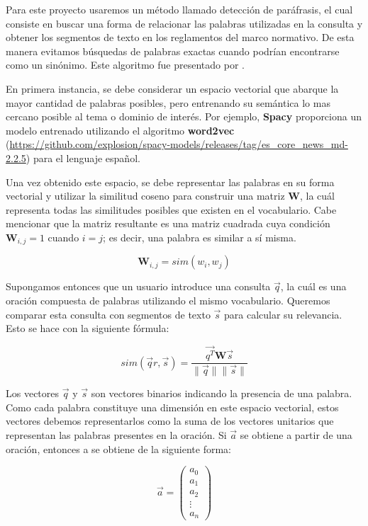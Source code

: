 Para este proyecto usaremos un método llamado detección de paráfrasis, el cual consiste en buscar una forma de relacionar las palabras utilizadas en la consulta y obtener los segmentos de texto en los reglamentos del marco normativo. De esta manera evitamos búsquedas de palabras exactas cuando podrían encontrarse como un sinónimo. Este algoritmo fue presentado por \cite{fernando2008semantic}.

En primera instancia, se debe considerar un espacio vectorial que abarque la mayor cantidad de palabras posibles, pero entrenando su semántica lo mas cercano posible al tema o dominio de interés. Por ejemplo, \textbf{Spacy} proporciona un modelo entrenado utilizando el algoritmo \textbf{word2vec} (\url{https://github.com/explosion/spacy-models/releases/tag/es_core_news_md-2.2.5}) para el lenguaje español. 

Una vez obtenido este espacio, se debe representar las palabras en su forma vectorial y utilizar la similitud coseno para construir una matriz $\mathbf{W}$, la cuál representa todas las similitudes posibles que existen en el vocabulario. Cabe mencionar que la matriz resultante es una matriz cuadrada cuya condición $\mathbf{W}_{i,j} = 1$ cuando $i = j$; es decir, una palabra es similar a sí misma.

$$
\mathbf{W}_{i,j} = sim(w_i, w_j)
$$

Supongamos entonces que un usuario introduce una consulta $\vec{q}$, la cuál es una oración compuesta de palabras utilizando el mismo vocabulario. Queremos comparar esta consulta con segmentos de texto $\vec{s}$ para calcular su relevancia. Esto se hace con la siguiente fórmula:

$$
sim(\vec{q}r, \vec{s}) = \frac{ \vec{q^T} \mathbf{W} \vec{s}}{\| \vec{q} \|  \| \vec{s} \|}
$$

Los vectores $\vec{q}$ y $\vec{s}$ son vectores binarios indicando la presencia de una palabra. Como cada palabra constituye una dimensión en este espacio vectorial, estos vectores debemos representarlos como la suma de los vectores unitarios que representan las palabras presentes en la oración. Si $\vec{a}$ se obtiene a partir de una oración, entonces a se obtiene de la siguiente forma:

$$
\vec{a} = 
\begin{pmatrix}
    a_0\\
    a_1\\
    a_2\\
    \vdots \\
    a_n
\end{pmatrix}
$$

